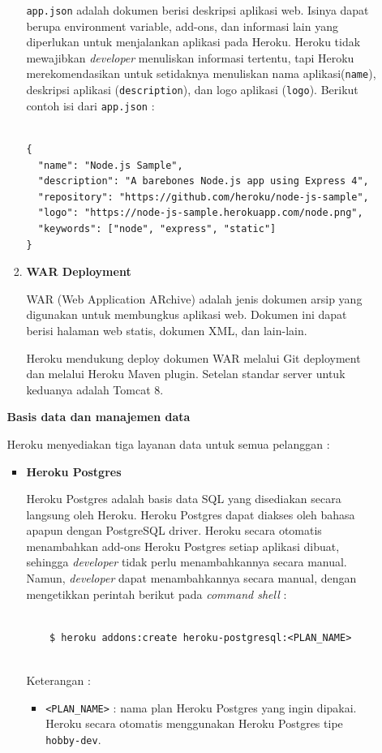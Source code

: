 \documentclass[a4paper,twoside]{article}
\begin{document}
\begin{enumerate}
\begin{enumerate}
\begin{enumerate}
\texttt{app.json} adalah dokumen berisi deskripsi aplikasi web. Isinya dapat berupa environment variable, add-ons, dan informasi lain yang diperlukan untuk menjalankan aplikasi pada Heroku. Heroku tidak mewajibkan \textit{developer} menuliskan informasi tertentu, tapi Heroku merekomendasikan untuk setidaknya menuliskan nama aplikasi(\texttt{name}), deskripsi aplikasi (\texttt{description}), dan logo aplikasi (\texttt{logo}). Berikut contoh isi dari \texttt{app.json} :
\begin{lstlisting}

{
  "name": "Node.js Sample",
  "description": "A barebones Node.js app using Express 4",
  "repository": "https://github.com/heroku/node-js-sample",
  "logo": "https://node-js-sample.herokuapp.com/node.png",
  "keywords": ["node", "express", "static"]
}

\end{lstlisting}

\item \textbf{WAR Deployment}

WAR (Web Application ARchive) adalah jenis dokumen arsip yang digunakan untuk membungkus aplikasi web. Dokumen ini dapat berisi halaman web statis, dokumen XML, dan lain-lain.
 
Heroku mendukung deploy dokumen WAR melalui Git deployment dan melalui Heroku Maven plugin. Setelan standar server untuk keduanya adalah Tomcat 8.

\end{enumerate}

			\textbf{Basis data dan manajemen data}
		
			Heroku menyediakan tiga layanan data untuk semua pelanggan :
\begin{itemize}
\item \textbf{Heroku Postgres}

Heroku Postgres adalah basis data SQL yang disediakan secara langsung oleh Heroku. Heroku Postgres dapat diakses oleh bahasa apapun dengan PostgreSQL driver. Heroku secara otomatis menambahkan add-ons Heroku Postgres setiap aplikasi dibuat, sehingga \textit{developer} tidak perlu menambahkannya secara manual. Namun, \textit{developer} dapat menambahkannya secara manual, dengan mengetikkan perintah berikut pada \textit{command shell} :
\begin{lstlisting}
	
	$ heroku addons:create heroku-postgresql:<PLAN_NAME>
	
\end{lstlisting}
Keterangan :
\begin{itemize}
\item \texttt{<PLAN\_NAME>} : nama plan Heroku Postgres yang ingin dipakai. Heroku secara otomatis menggunakan Heroku Postgres tipe \texttt{hobby-dev}.
\end{itemize}


\end{itemize}
\end{enumerate}
\end{enumerate}
\end{document}
